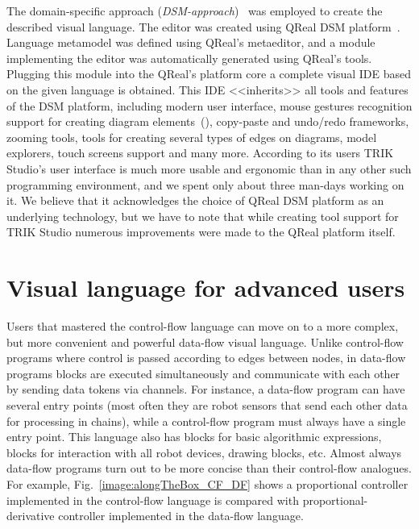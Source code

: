 \documentclass[conference]{IEEEtran}
\begin{document}
The domain-specific approach (\textit{DSM-approach})~\cite{koznov2008} was employed to create the described visual language. The editor was created using QReal DSM platform~\cite{qrealMeta,kuzenkova2013qreal}.  Language metamodel was defined using QReal's metaeditor, and a module implementing the editor was automatically generated using QReal's tools. Plugging this module into the QReal's platform core a complete visual IDE based on the given language is obtained. This IDE <<inherits>> all tools and features of the DSM platform, including modern user interface, mouse gestures recognition support for creating diagram elements~(\cite{osechkina2010gestures,osechkina2012multistroke}), copy-paste and undo/redo frameworks, zooming tools, tools for creating several types of edges on diagrams, model explorers, touch screens support and many more. According to its users TRIK Studio's user interface is much more usable and ergonomic than in any other such programming environment, and we spent only about three man-days working on it. We believe that it acknowledges the choice of QReal DSM platform as an underlying technology, but we have to note that while creating tool support for TRIK Studio numerous improvements were made to the QReal platform itself.

\section{Visual language for advanced users}
\label{chapter:dataFlowLanguage}

Users that mastered the control-flow language can move on to a more complex, but more convenient and powerful data-flow visual language. Unlike control-flow programs where control is passed according to edges between nodes, in data-flow programs blocks are executed simultaneously and communicate with each other by sending data tokens via channels. For instance, a data-flow program can have several entry points (most often they are robot sensors that send each other data for processing in chains), while a control-flow program must always have a single entry point. This language also has blocks for basic algorithmic expressions, blocks for interaction with all robot devices, drawing blocks, etc. Almost always data-flow programs turn out to be more concise than their control-flow analogues. For example, Fig.~\ref{image:alongTheBox_CF_DF} shows a proportional controller implemented in the control-flow language is compared with proportional-derivative controller implemented in the data-flow language.
\end{document}
